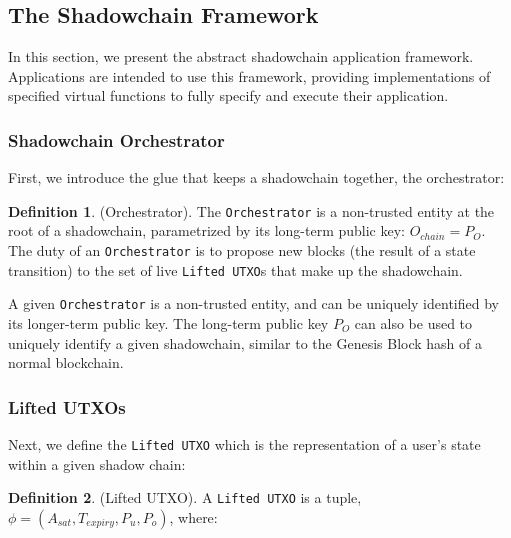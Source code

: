\documentclass[12pt,a4paper]{article}
\theoremstyle{definition}
\newtheorem{definition}{Definition}[section]
\begin{document}

\subsection{The Shadowchain Framework}

In this section, we present the abstract shadowchain application framework.
Applications are intended to use this framework, providing implementations of
specified virtual functions to fully specify and execute their application.

\subsubsection{Shadowchain Orchestrator}

First, we introduce the glue that keeps a shadowchain together, the
orchestrator:

\theoremstyle{definition}
\begin{definition}{(Orchestrator).} The \texttt{Orchestrator} is a non-trusted
    entity at the root of a shadowchain, parametrized by its long-term public
    key: $O_{chain} = P_{O}$. The duty of an \texttt{Orchestrator} is to
    propose new blocks (the result of a state transition) to the set of live
    \texttt{Lifted UTXO}s that make up the shadowchain.
\end{definition}

A given \texttt{Orchestrator} is a non-trusted entity, and can be uniquely
identified by its longer-term public key. The long-term public key $P_{O}$ can
also be used to uniquely identify a given shadowchain, similar to the Genesis
Block hash of a normal blockchain.

\subsubsection{Lifted UTXOs}

Next, we define the \texttt{Lifted UTXO} which is the representation of a
user's state within a given shadow chain:

\begin{definition}{(Lifted UTXO).} A \texttt{Lifted UTXO} is a tuple, 
    $ \phi = (A_{sat}, T_{expiry}, P_{u}, P_{o})$, where:
\end{definition}
\end{document}
